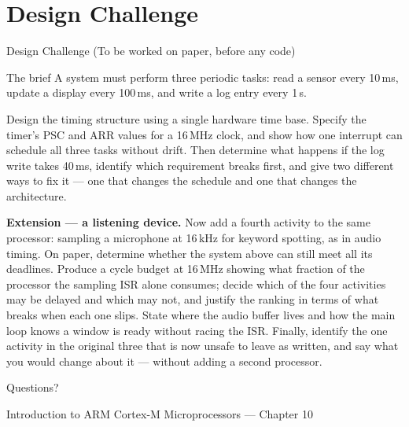 \documentclass[aspectratio=169]{beamer}
\begin{document}
\section{Design Challenge}

\begin{frame}{Design Challenge \small (To be worked on paper, before any code)}
\begin{block}{The brief}
A system must perform three periodic tasks: read a sensor every 10\,ms,
update a display every 100\,ms, and write a log entry every 1\,s.
\end{block}

\small
Design the timing structure using a single hardware time base. Specify
the timer's PSC and ARR values for a 16\,MHz clock, and show how one
interrupt can schedule all three tasks without drift. Then determine
what happens if the log write takes 40\,ms, identify which requirement
breaks first, and give two different ways to fix it --- one that
changes the schedule and one that changes the architecture.

\vspace{0.5em}
\textbf{Extension --- a listening device.} Now add a fourth activity to
the same processor: sampling a microphone at 16\,kHz for keyword
spotting, as in audio timing. On paper, determine whether the system
above can still meet all its deadlines. Produce a cycle budget at
16\,MHz showing what fraction of the processor the sampling ISR alone
consumes; decide which of the four activities may be delayed and which
may not, and justify the ranking in terms of what breaks when each one
slips. State where the audio buffer lives and how the main loop knows a
window is ready without racing the ISR. Finally, identify the one
activity in the original three that is now unsafe to leave as written,
and say what you would change about it --- without adding a second
processor.
\end{frame}

\begin{frame}
  \centering
  \Huge Questions?

  \vspace{1em}
  \large Introduction to ARM Cortex-M Microprocessors --- Chapter 10
\end{frame}
\end{document}
